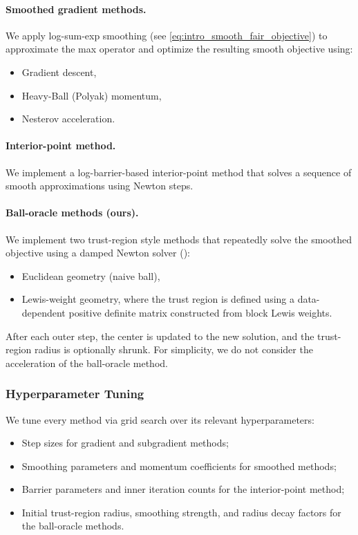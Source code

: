 \paragraph{Smoothed gradient methods.}
We apply log-sum-exp smoothing (see \ref{eq:intro_smooth_fair_objective}) to approximate the max operator and optimize the resulting smooth objective using:
\begin{itemize}
    \item Gradient descent,
    \item Heavy-Ball (Polyak) momentum,
    \item Nesterov acceleration.
\end{itemize}

\paragraph{Interior-point method.}
We implement a log-barrier-based interior-point method that solves a sequence of smooth approximations using Newton steps.

\paragraph{Ball-oracle methods (ours).}
We implement two trust-region style methods that repeatedly solve the smoothed objective using a damped Newton solver ():
\begin{itemize}
    \item Euclidean geometry (naive ball),
    \item Lewis-weight geometry, where the trust region is defined using a data-dependent positive definite matrix constructed from block Lewis weights.
\end{itemize}

After each outer step, the center is updated to the new solution, and the trust-region radius is optionally shrunk. For simplicity, we do not consider the acceleration of the ball-oracle method. 


\subsubsection{Hyperparameter Tuning}

We tune every method via grid search over its relevant hyperparameters:

\begin{itemize}
    \item Step sizes for gradient and subgradient methods;
    \item Smoothing parameters and momentum coefficients for smoothed methods;
    \item Barrier parameters and inner iteration counts for the interior-point method;
    \item Initial trust-region radius, smoothing strength, and radius decay factors for the ball-oracle methods.
\end{itemize}

